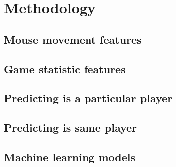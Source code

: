 \documentclass[Report.tex]{subfiles}
\begin{document}
\section{Methodology}

\subsection{Mouse movement features}

\subsection{Game statistic features}

\subsection{Predicting is a particular player}

\subsection{Predicting is same player}

\subsection{Machine learning models}
\end{document}
